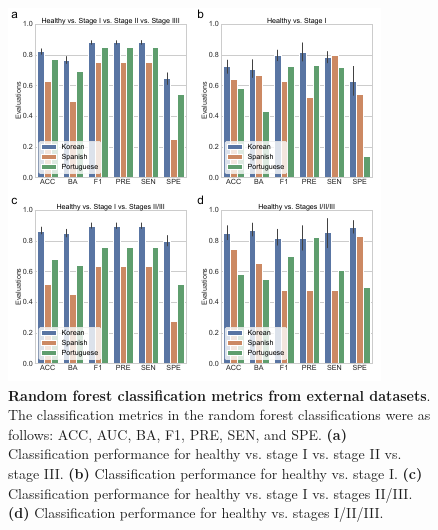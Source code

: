\documentclass[11pt, a4paper, onecolumn, oneside]{report}
\begin{document}
            \begin{figure}[p]
                \centering
                \includegraphics[width=\linewidth]{Figures/Periodontitis/Figure_5.pdf}
                \caption[Random forest classification metrics from external datasets]{\textbf{Random forest classification metrics from external datasets}. \\
                    The classification metrics in the random forest classifications were as follows: ACC, AUC, BA, F1, PRE, SEN, and SPE. \textbf{(a)} Classification performance for healthy vs. stage I vs. stage II vs. stage III. \textbf{(b)} Classification performance for healthy vs. stage I. \textbf{(c)} Classification performance for healthy vs. stage I vs. stages II/III. \textbf{(d)} Classification performance for healthy vs. stages I/II/III.}
                \label{fig:Periodontitis-validation}
            \end{figure}
            \clearpage
\end{document}
